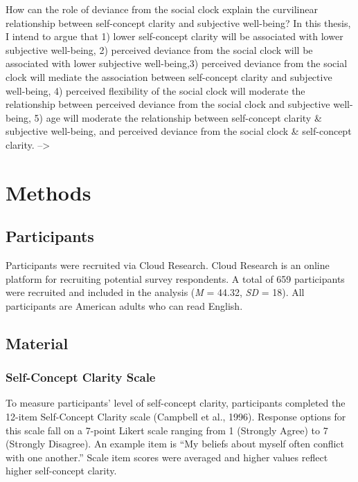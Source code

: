 \documentclass[
  man,floatsintext]{apa6}
\begin{document}
How can the role of deviance from the social clock explain the curvilinear relationship between self-concept clarity and subjective well-being?
In this thesis, I intend to argue that 1) lower self-concept clarity will be associated with lower subjective well-being, 2) perceived deviance from the social clock will be associated with lower subjective well-being,3) perceived deviance from the social clock will mediate the association between self-concept clarity and subjective well-being, 4) perceived flexibility of the social clock will moderate the relationship between perceived deviance from the social clock and subjective well-being, 5) age will moderate the relationship between self-concept clarity \& subjective well-being, and perceived deviance from the social clock \& self-concept clarity.
--\textgreater{}

\hypertarget{methods}{%
\section{Methods}\label{methods}}

\hypertarget{participants}{%
\subsection{Participants}\label{participants}}

Participants were recruited via Cloud Research. Cloud Research is an online platform for recruiting potential survey respondents. A total of 659 participants were recruited and included in the analysis (\emph{M} = 44.32, \emph{SD} = 18). All participants are American adults who can read English.

\hypertarget{material}{%
\subsection{Material}\label{material}}

\hypertarget{self-concept-clarity-scale}{%
\subsubsection{Self-Concept Clarity Scale}\label{self-concept-clarity-scale}}

To measure participants' level of self-concept clarity, participants completed the 12-item Self-Concept Clarity scale (Campbell et al., 1996). Response options for this scale fall on a 7-point Likert scale ranging from 1 (Strongly Agree) to 7 (Strongly Disagree). An example item is ``My beliefs about myself often conflict with one another.'' Scale item scores were averaged and higher values reflect higher self-concept clarity.
\end{document}

